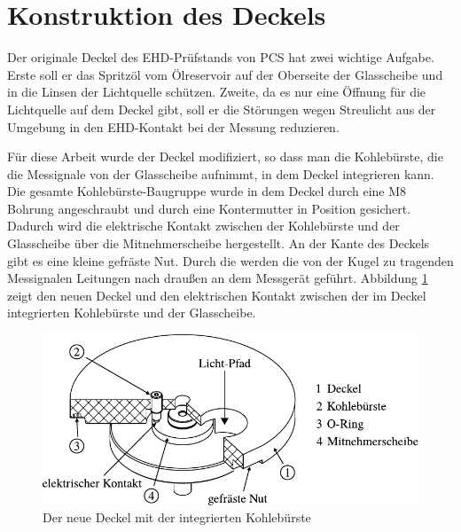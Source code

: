 \section{Konstruktion des Deckels}
\label{sec:konstruktion_des_deckels}

Der originale Deckel des EHD-Prüfstands von PCS hat zwei wichtige Aufgabe.
Erste soll er das Spritzöl vom Ölreservoir auf der Oberseite der Glasscheibe und in die Linsen der Lichtquelle schützen.
Zweite, da es nur eine Öffnung für die Lichtquelle auf dem Deckel gibt, soll er die Störungen wegen Streulicht aus der Umgebung in den EHD-Kontakt bei der Messung reduzieren.

Für diese Arbeit wurde der Deckel modifiziert, so dass man die Kohlebürste, die die Messignale von der Glasscheibe aufnimmt, in dem Deckel integrieren kann.
Die gesamte Kohlebürste-Baugruppe wurde in dem Deckel durch eine M8 Bohrung angeschraubt und durch eine Kontermutter in Position gesichert.
Dadurch wird die elektrische Kontakt zwischen der Kohlebürste und der Glasscheibe über die Mitnehmerscheibe hergestellt.
An der Kante des Deckels gibt es eine kleine gefräste Nut.
Durch die werden die von der Kugel zu tragenden Messignalen Leitungen nach draußen an dem Messgerät geführt.
Abbildung \ref{fig:deckel_mit_kohlebuersten} zeigt den neuen Deckel und den elektrischen Kontakt zwischen der im Deckel integrierten Kohlebürste und der Glasscheibe.
\begin{figure}[htb]
    \centering
    \includegraphics[]{./images/deckel_und_scheibe.pdf}
    \caption{Der neue Deckel mit der integrierten Kohlebürste}
    \label{fig:deckel_mit_kohlebuersten}
\end{figure}
%
